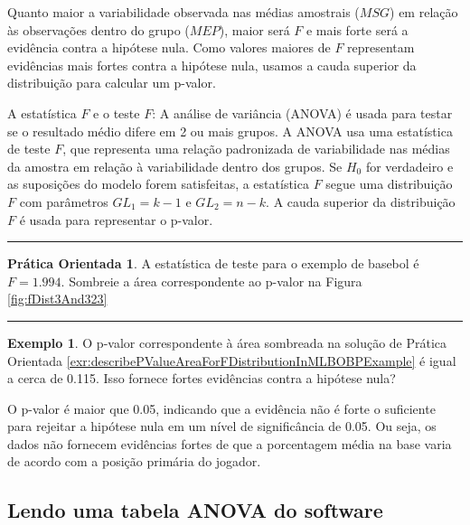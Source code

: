 \documentclass[
]{book}
\theoremstyle{definition}
\theoremstyle{definition}
\newtheorem{example}{Exemplo}[chapter]
\theoremstyle{definition}
\newtheorem{exercise}{Prática Orientada}[chapter]
\theoremstyle{definition}
\theoremstyle{remark}
\begin{document}
Quanto maior a variabilidade observada nas médias amostrais (\(MSG\)) em relação às observações dentro do grupo (\(MEP\)), maior será \(F\) e mais forte será a evidência contra a hipótese nula. Como valores maiores de \(F\) representam evidências mais fortes contra a hipótese nula, usamos a cauda superior da distribuição para calcular um p-valor.

A estatística \(F\) e o teste \(F\): A análise de variância (ANOVA) é usada para testar se o resultado médio difere em 2 ou mais grupos. A ANOVA usa uma estatística de teste \(F\), que representa uma relação padronizada de variabilidade nas médias da amostra em relação à variabilidade dentro dos grupos. Se \(H_0\) for verdadeiro e as suposições do modelo forem satisfeitas, a estatística \(F\) segue uma distribuição \(F\) com parâmetros \(GL_{1}=k-1\) e \(GL_{2}=n-k\). A cauda superior da distribuição \(F\) é usada para representar o p-valor.

\begin{center}\rule{0.5\linewidth}{0.5pt}\end{center}

\begin{exercise}
\protect\hypertarget{exr:describePValueAreaForFDistributionInMLBOBPExample}{}{\label{exr:describePValueAreaForFDistributionInMLBOBPExample} }A estatística de teste para o exemplo de basebol é \(F=1.994\). Sombreie a área correspondente ao p-valor na Figura \ref{fig:fDist3And323}
\end{exercise}

\begin{center}\rule{0.5\linewidth}{0.5pt}\end{center}

\begin{example}
\protect\hypertarget{exm:unnamed-chunk-224}{}{\label{exm:unnamed-chunk-224} }O p-valor correspondente à área sombreada na solução de Prática Orientada \ref{exr:describePValueAreaForFDistributionInMLBOBPExample} é igual a cerca de 0.115. Isso fornece fortes evidências contra a hipótese nula?
\end{example}

O p-valor é maior que 0.05, indicando que a evidência não é forte o suficiente para rejeitar a hipótese nula em um nível de significância de 0.05. Ou seja, os dados não fornecem evidências fortes de que a porcentagem média na base varia de acordo com a posição primária do jogador.

\hypertarget{readingANOVATable}{%
\subsection{Lendo uma tabela ANOVA do software}\label{readingANOVATable}}
\end{document}
